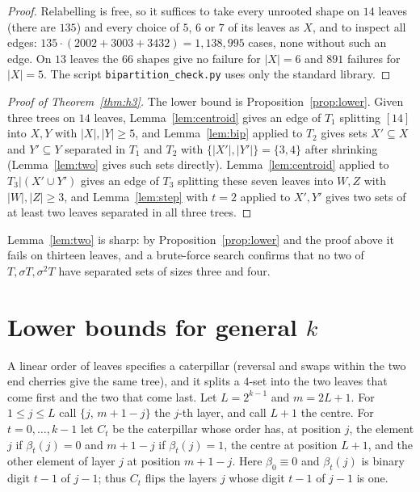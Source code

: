 \documentclass[11pt]{amsart}
\theoremstyle{remark}
\begin{document}
\begin{proof}
Relabelling is free, so it suffices to take every unrooted shape on $14$ leaves (there are $135$) and every choice of $5$, $6$ or $7$ of its leaves as $X$, and to inspect all edges: $135\cdot(2002+3003+3432)=1{,}138{,}995$ cases, none without such an edge. On $13$ leaves the $66$ shapes give no failure for $|X|=6$ and $891$ failures for $|X|=5$. The script \texttt{bipartition\_check.py} uses only the standard library.
\end{proof}

\begin{proof}[Proof of Theorem~\ref{thm:h3}]
The lower bound is Proposition~\ref{prop:lower}. Given three trees on $14$ leaves, Lemma~\ref{lem:centroid} gives an edge of $T_1$ splitting $[14]$ into $X,Y$ with $|X|,|Y|\ge5$, and Lemma~\ref{lem:bip} applied to $T_2$ gives sets $X'\subseteq X$ and $Y'\subseteq Y$ separated in $T_1$ and $T_2$ with $\{|X'|,|Y'|\}=\{3,4\}$ after shrinking (Lemma~\ref{lem:two} gives such sets directly). Lemma~\ref{lem:centroid} applied to $T_3|(X'\cup Y')$ gives an edge of $T_3$ splitting these seven leaves into $W,Z$ with $|W|,|Z|\ge3$, and Lemma~\ref{lem:step} with $t=2$ applied to $X',Y'$ gives two sets of at least two leaves separated in all three trees.
\end{proof}

Lemma~\ref{lem:two} is sharp: by Proposition~\ref{prop:lower} and the proof above it fails on thirteen leaves, and a brute-force search confirms that no two of $T,\sigma T,\sigma^2T$ have separated sets of sizes three and four.

\section{\texorpdfstring{Lower bounds for general $k$}{Lower bounds for general k}}\label{sec:lowerbounds}

A linear order of leaves specifies a caterpillar (reversal and swaps within the two end cherries give the same tree), and it splits a $4$-set into the two leaves that come first and the two that come last. Let $L=2^{k-1}$ and $m=2L+1$. For $1\le j\le L$ call $\{j,\,m+1-j\}$ the $j$-th layer, and call $L+1$ the centre. For $t=0,\dots,k-1$ let $C_t$ be the caterpillar whose order has, at position $j$, the element $j$ if $\beta_t(j)=0$ and $m+1-j$ if $\beta_t(j)=1$, the centre at position $L+1$, and the other element of layer $j$ at position $m+1-j$. Here $\beta_0\equiv0$ and $\beta_t(j)$ is binary digit $t-1$ of $j-1$; thus $C_t$ flips the layers $j$ whose digit $t-1$ of $j-1$ is one.
\end{document}
